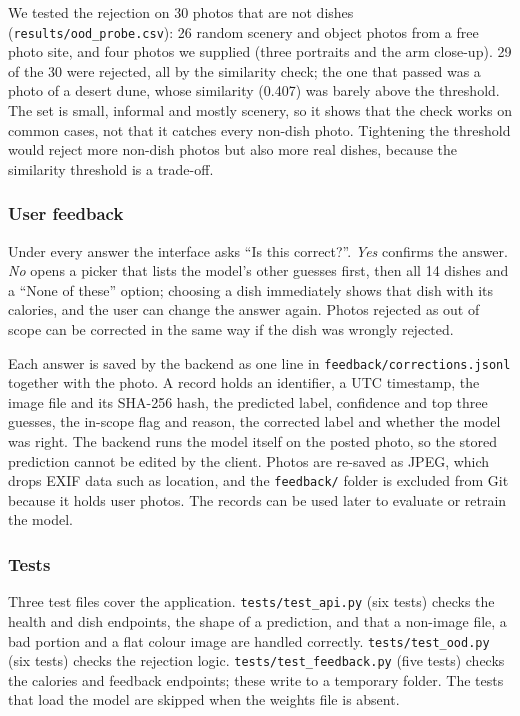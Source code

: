 We tested the rejection on 30 photos that are not dishes
(\texttt{results/ood\_probe.csv}): 26 random scenery and object photos from a free
photo site, and four photos we supplied (three portraits and the arm close-up).
29 of the 30 were rejected, all by the similarity check; the one that passed was a
photo of a desert dune, whose similarity (0.407) was barely above the threshold.
The set is small, informal and mostly scenery, so it shows that the check works
on common cases, not that it catches every non-dish photo. Tightening the
threshold would reject more non-dish photos but also more real dishes, because
the similarity threshold is a trade-off.

\subsubsection{User feedback}
Under every answer the interface asks ``Is this correct?''. \emph{Yes} confirms the
answer. \emph{No} opens a picker that lists the model's other guesses first, then
all 14 dishes and a ``None of these'' option; choosing a dish immediately shows
that dish with its calories, and the user can change the answer again. Photos
rejected as out of scope can be corrected in the same way if the dish was
wrongly rejected.

Each answer is saved by the backend as one line in
\texttt{feedback/corrections.jsonl} together with the photo. A record holds an
identifier, a UTC timestamp, the image file and its SHA-256 hash, the predicted
label, confidence and top three guesses, the in-scope flag and reason, the
corrected label and whether the model was right. The backend runs the model
itself on the posted photo, so the stored prediction cannot be edited by the
client. Photos are re-saved as JPEG, which drops EXIF data such as location, and
the \texttt{feedback/} folder is excluded from Git because it holds user photos.
The records can be used later to evaluate or retrain the model.

\subsubsection{Tests}
Three test files cover the application. \texttt{tests/test\_api.py} (six tests)
checks the health and dish endpoints, the shape of a prediction, and that a
non-image file, a bad portion and a flat colour image are handled correctly.
\texttt{tests/test\_ood.py} (six tests) checks the rejection logic.
\texttt{tests/test\_feedback.py} (five tests) checks the calories and feedback
endpoints; these write to a temporary folder. The tests that load the model are
skipped when the weights file is absent.

